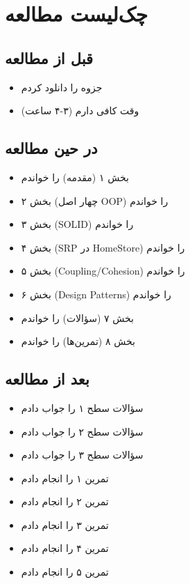 \documentclass[12pt, a4paper]{article}
\begin{document}
\section{چک‌لیست مطالعه}

\subsection{قبل از مطالعه}
\begin{itemize}
    \item[$\square$] جزوه را دانلود کردم
    \item[$\square$] وقت کافی دارم (۳-۴ ساعت)
\end{itemize}

\subsection{در حین مطالعه}
\begin{itemize}
    \item[$\square$] بخش ۱ (مقدمه) را خواندم
    \item[$\square$] بخش ۲ (چهار اصل OOP) را خواندم
    \item[$\square$] بخش ۳ (SOLID) را خواندم
    \item[$\square$] بخش ۴ (SRP در HomeStore) را خواندم
    \item[$\square$] بخش ۵ (Coupling/Cohesion) را خواندم
    \item[$\square$] بخش ۶ (Design Patterns) را خواندم
    \item[$\square$] بخش ۷ (سؤالات) را خواندم
    \item[$\square$] بخش ۸ (تمرین‌ها) را خواندم
\end{itemize}

\subsection{بعد از مطالعه}
\begin{itemize}
    \item[$\square$] سؤالات سطح ۱ را جواب دادم
    \item[$\square$] سؤالات سطح ۲ را جواب دادم
    \item[$\square$] سؤالات سطح ۳ را جواب دادم
    \item[$\square$] تمرین ۱ را انجام دادم
    \item[$\square$] تمرین ۲ را انجام دادم
    \item[$\square$] تمرین ۳ را انجام دادم
    \item[$\square$] تمرین ۴ را انجام دادم
    \item[$\square$] تمرین ۵ را انجام دادم
\end{itemize}
\end{document}
